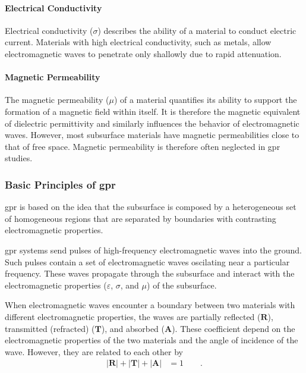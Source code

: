 \paragraph{Electrical Conductivity}
Electrical conductivity (\(\sigma\)) describes the ability of a material to conduct electric current. 
Materials with high electrical conductivity, such as metals, allow electromagnetic waves to penetrate only shallowly due to rapid attenuation. 

\paragraph{Magnetic Permeability}
The magnetic permeability (\(\mu\)) of a material quantifies its ability to support the formation of a magnetic field within itself. 
It is therefore the magnetic equivalent of dielectric permittivity and similarly influences the behavior of electromagnetic waves.
However, most subsurface materials have magnetic permeabilities close to that of free space. 
Magnetic permeability is therefore often neglected in \gls{gpr} studies.

\subsubsection{Basic Principles of \gls{gpr}}
\gls{gpr} is based on the idea that the subsurface is composed by a heterogeneous set of homogeneous regions that are separated by boundaries with contrasting electromagnetic properties.

\gls{gpr} systems send pulses of high-frequency electromagnetic waves into the ground. 
Such pulses contain a set of electromagnetic waves oscilating near a particular frequency. 
These waves propagate through the subsurface and interact with the electromagnetic properties (\(\varepsilon\), \(\sigma\), and \(\mu\)) of the subsurface.

When electromagnetic waves encounter a boundary between two materials with different electromagnetic properties, the waves are partially reflected (\(\mathbf{R}\)), transmitted (refracted) (\(\mathbf{T}\)), and absorbed (\(\mathbf{A}\)).
These coefficient depend on the electromagnetic properties of the two materials and the angle of incidence of the wave. 
However, they are related to each other by 
\begin{align}
   |\mathbf{R}| + |\mathbf{T}| + |\mathbf{A}| &= 1\label{al:rtarelationship}\qquad .
\end{align}

